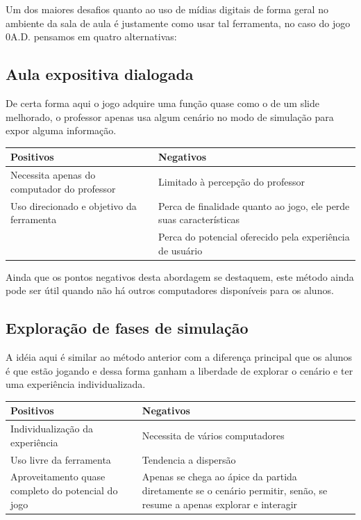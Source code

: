 \documentclass[article,11pt, a4paper,sumario=tradicional]{abntex2}
\begin{document}
    Um dos maiores desafios quanto ao uso de mídias digitais de forma geral no ambiente da sala de aula é justamente como usar tal ferramenta, no caso do jogo 0A.D. pensamos em quatro alternativas:

    \subsection*{Aula expositiva dialogada}
        De certa forma aqui o jogo adquire uma função quase como o de um slide melhorado, o professor apenas usa algum cenário no modo de simulação para expor alguma informação.
        
        \begin{tabular}{|p{5cm}|p{5cm}|}
        	\hline 
            \textbf{Positivos} & \textbf{Negativos} \\ 
        	\hline 
        	Necessita apenas  do computador do professor & Limitado à percepção do professor \\ 
        	\hline
            Uso direcionado e objetivo da ferramenta & Perca de finalidade quanto ao jogo, ele perde suas características \\
            \hline
            & Perca do potencial oferecido pela experiência de usuário \\
            \hline
        \end{tabular} 

        Ainda que os pontos negativos desta abordagem se destaquem, este método ainda pode ser útil quando não há outros computadores disponíveis para os alunos.
    \subsection*{Exploração de fases de simulação}
        A idéia aqui é similar ao método anterior com a diferença principal que os alunos é que estão jogando e dessa forma ganham a liberdade de explorar o cenário e ter uma experiência individualizada.

        \begin{tabular}{|p{5cm}|p{5cm}|}
        	\hline 
            \textbf{Positivos} & \textbf{Negativos} \\ 
        	\hline 
        	Individualização da experiência & Necessita de vários computadores \\ 
        	\hline
            Uso livre da ferramenta & Tendencia a dispersão \\
            \hline
            Aproveitamento quase completo do potencial do jogo & Apenas se chega ao ápice da partida diretamente se o cenário permitir, senão, se resume a apenas explorar e interagir\\
            \hline
        \end{tabular} 
        
\end{document}

